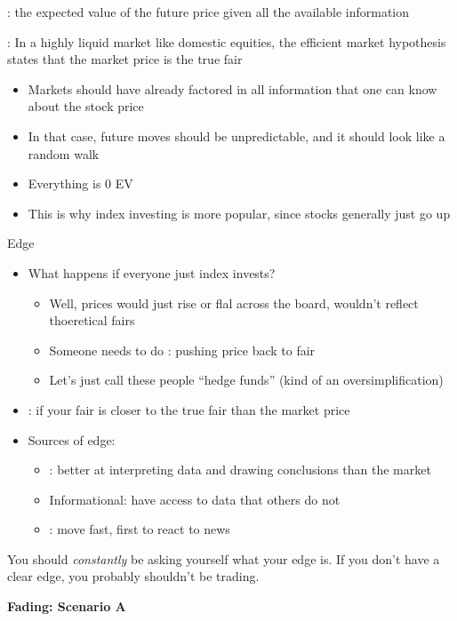: the expected value of the future price given all the available information

: In a highly liquid market like domestic equities, the efficient market hypothesis states that the market price is the true fair
\begin{itemize}
    \item Markets should have already factored in all information that one can know about the stock price
    \item In that case, future moves should be unpredictable, and it should look like a random walk
    \item Everything is 0 EV
    \item This is why index investing is more popular, since stocks generally just go up
\end{itemize}

Edge
\begin{itemize}
    \item What happens if everyone just index invests?
        \begin{itemize}
            \item Well, prices would just rise or flal across the board, wouldn't reflect thoeretical fairs
            \item Someone needs to do : pushing price back to fair
            \item Let's just call these people ``hedge funds'' (kind of an oversimplification)
        \end{itemize}
    \item {}: if your fair is closer to the true fair than the market price
    \item Sources of edge:
        \begin{itemize}
            \item {}: better at interpreting data and drawing conclusions than the market
            \item Informational: have access to data that others do not
            \item {}: move fast, first to react to news
        \end{itemize}
\end{itemize}

You should \textit{constantly} be asking yourself what your edge is. If you don't have a clear edge, you probably shouldn't be trading.

\textbf{Fading: Scenario A}

